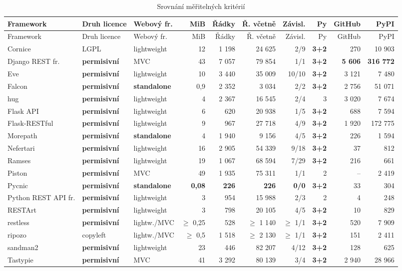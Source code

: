 \begin{landscape}
\begin{longtable}[]{@{}lllrrrrrrr@{}}

\caption{Srovnání měřitelných kritérií \label{tab:srovnani}}\tabularnewline
\toprule
Framework & Druh licence & Webový fr. & MiB & Řádky & Ř. včetně & Závisl. & Py & GitHub & PyPI\tabularnewline
\midrule
\endfirsthead
\toprule
Framework & Druh licence & Webový fr. & MiB & Řádky & Ř. včetně & Závisl. & Py & GitHub & PyPI\tabularnewline
\midrule
\endhead
Cornice & LGPL & lightweight & 12 & 1 198 & 24 625 & 2/9 & \textbf{3+2} & 270 & 10 903\tabularnewline
Django REST fr. & \textbf{permisivní} & MVC & 43 & 7 057 & 79 854 & 1/1 & \textbf{3+2} & \textbf{5 606} & \textbf{316 772}\tabularnewline
Eve & \textbf{permisivní} & lightweight & 10 & 3 440 & 35 009 & 10/10 & \textbf{3+2} & 3 121 & 7 480\tabularnewline
Falcon & \textbf{permisivní} & \textbf{standalone} & 0,9 & 2 352 & 3 034 & 2/2 & \textbf{3+2} & 2 756 & 51 071\tabularnewline
hug & \textbf{permisivní} & lightweight & 4 & 2 367 & 16 545 & 2/4 & 3 & 3 020 & 7 674\tabularnewline
Flask API & \textbf{permisivní} & lightweight & 6 & 620 & 20 938 & 1/5 & \textbf{3+2} & 688 & 7 594\tabularnewline
Flask-RESTful & \textbf{permisivní} & lightweight & 9 & 967 & 27 718 & 4/9 & \textbf{3+2} & 1 920 & 172 775\tabularnewline
Morepath & \textbf{permisivní} & \textbf{standalone} & 4 & 1 940 & 9 156 & 4/5 & \textbf{3+2} & 226 & 1 594\tabularnewline
Nefertari & \textbf{permisivní} & lightweight & 16 & 2 905 & 54 339 & 9/18 & \textbf{3+2} & 37 & 812\tabularnewline
Ramses & \textbf{permisivní} & lightweight & 19 & 1 067 & 68 594 & 7/29 & \textbf{3+2} & 216 & 661\tabularnewline
Piston & \textbf{permisivní} & MVC & 49 & 1 935 & 75 311 & 1/1 & 2 & -- & 2 419\tabularnewline
Pycnic & \textbf{permisivní} & \textbf{standalone} & \textbf{0,08} & \textbf{226} & \textbf{226} & \textbf{0/0} & \textbf{3+2} & 33 & 304\tabularnewline
Python REST API fr. & \textbf{permisivní} & lightweight & 3 & 954 & 15 988 & 2/3 & 2 & 4 & 248\tabularnewline
RESTArt & \textbf{permisivní} & lightweight & 3 & 798 & 20 105 & 4/5 & \textbf{3+2} & 10 & 829\tabularnewline
restless & \textbf{permisivní} & lightw./MVC & \(\geq\) 0,25 & 528 & \(\geq\) 1 140 & \(\geq\) 1/1 & \textbf{3+2} & 520 & 7 909\tabularnewline
ripozo & copyleft & lightw./MVC & \(\geq\) 0,5 & 1 518 & \(\geq\) 2 130 & \(\geq\) 1/1 & \textbf{3+2} & 151 & 2 411\tabularnewline
sandman2 & \textbf{permisivní} & lightweight & 23 & 446 & 82 207 & 4/12 & \textbf{3+2} & 128 & 625\tabularnewline
Tastypie & \textbf{permisivní} & MVC & 41 & 3 292 & 80 139 & 3/4 & \textbf{3+2} & 2 940 & 28 966\tabularnewline
\bottomrule
\end{longtable}
\end{landscape}

